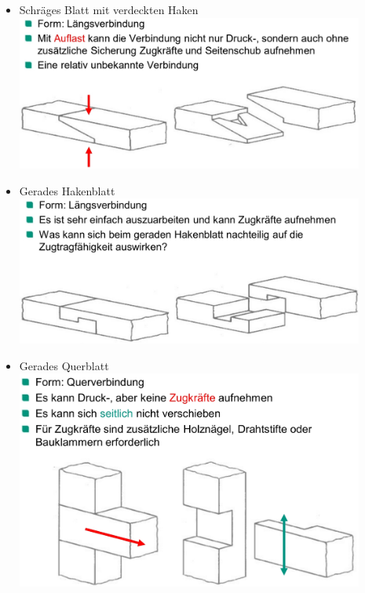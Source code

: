 \documentclass[fleqn,twoside]{article}
\begin{document}
    \begin{minipage}{0.45\textwidth}
        \begin{itemize}
                    \item Schräges Blatt mit verdeckten Haken\\
                        \includegraphics[width=0.9\textwidth]{Grafiken/Zimmermansmaessige Verbindungen/Verbindungsarten/Schraeges Blatt mit verdeckten Haken.jpg}\\
                    \item Gerades Hakenblatt\\
                        \includegraphics[width=0.9\textwidth]{Grafiken/Zimmermansmaessige Verbindungen/Verbindungsarten/Gerades Hakenblatt.jpg}\\
                    \item Gerades Querblatt\\
                        \includegraphics[width=0.9\textwidth]{Grafiken/Zimmermansmaessige Verbindungen/Verbindungsarten/Gerades Querblatt.jpg}\\

\end{itemize}
\end{minipage}
\end{document}
